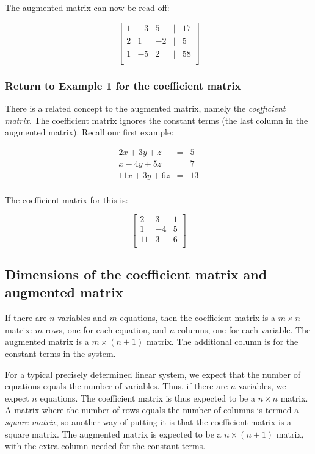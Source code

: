 \documentclass[10pt]{amsart}
\begin{document}
The augmented matrix can now be read off:

$$\left[\begin{matrix}
1 & -3 & 5 & \mid & 17\\
2 & 1 & -2 & \mid & 5\\
1 & -5 & 2 & \mid & 58\\
\end{matrix}\right]$$

\subsubsection{Return to Example 1 for the coefficient matrix}

There is a related concept to the augmented matrix, namely the {\em
  coefficient matrix}. The coefficient matrix ignores the constant
terms (the last column in the augmented matrix). Recall our first example:

\begin{eqnarray*}
  2x + 3y + z & = & 5\\
  x - 4y + 5z & = & 7\\
  11x + 3y + 6z & = & 13 \\
\end{eqnarray*}

The coefficient matrix for this is:

$$\left[\begin{matrix}
  2 & 3 & 1 \\
  1 &-4 & 5 \\
  11& 3 & 6 \\
\end{matrix}\right]$$

\subsection{Dimensions of the coefficient matrix and augmented matrix}

If there are $n$ variables and $m$ equations, then the coefficient
matrix is a $m \times n$ matrix: $m$ rows, one for each equation, and
$n$ columns, one for each variable. The augmented matrix is a $m
\times (n + 1)$ matrix. The additional column is for the constant
terms in the system.

For a typical precisely determined linear system, we expect that the
number of equations equals the number of variables. Thus, if there are
$n$ variables, we expect $n$ equations. The coefficient matrix is thus
expected to be a $n \times n$ matrix. A matrix where the number of
rows equals the number of columns is termed a {\em square matrix}, so
another way of putting it is that the coefficient matrix is a square
matrix. The augmented matrix is expected to be a $n \times (n + 1)$
matrix, with the extra column needed for the constant terms.
\end{document}
